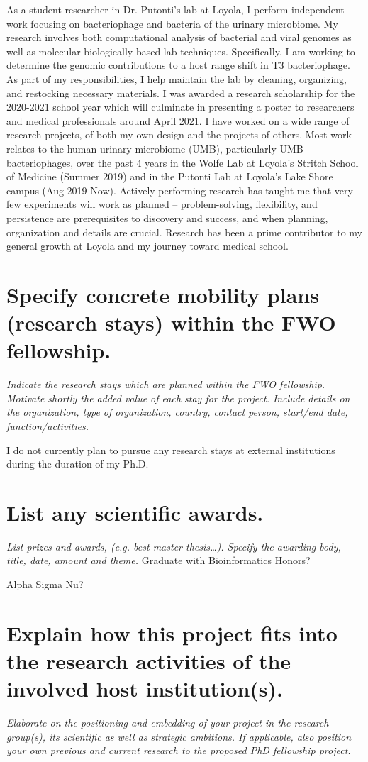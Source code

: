 As a student researcher in Dr. Putonti’s lab at Loyola, I perform independent work focusing on bacteriophage and bacteria of the urinary
microbiome. My research involves both computational analysis of bacterial and viral genomes as well as molecular biologically-based lab
techniques. Specifically, I am working to determine the genomic contributions to a host range shift in T3 bacteriophage. As part of my
responsibilities, I help maintain the lab by cleaning, organizing, and restocking necessary materials. I was awarded a research
scholarship for the 2020-2021 school year which will culminate in presenting a poster to researchers and medical professionals around
April 2021.
I have worked on a wide range of research projects, of both my own design and the projects of others. Most work relates to the human
urinary microbiome (UMB), particularly UMB bacteriophages, over the past 4 years in the Wolfe Lab at Loyola’s Stritch School of
Medicine (Summer 2019) and in the Putonti Lab at Loyola’s Lake Shore campus (Aug 2019-Now). Actively performing research has
taught me that very few experiments will work as planned -- problem-solving, flexibility, and persistence are prerequisites to discovery and
success, and when planning, organization and details are crucial. Research has been a prime contributor to my general growth at Loyola
and my journey toward medical school.


\section{Specify concrete mobility plans (research stays) within the FWO fellowship.}
\textit{
Indicate the research stays which are planned within the FWO fellowship. 
Motivate shortly the added value of each stay for the project. Include details on the organization, type of organization, country, contact person, start/end date, function/activities. 
}

I do not currently plan to pursue any research stays at external institutions during the duration of my Ph.D.


\section{List any scientific awards.}
\textit{
List prizes and awards, (e.g. best master thesis…). Specify the awarding body, title, date, amount and theme.
}
Graduate with Bioinformatics Honors?

Alpha Sigma Nu?


\section{Explain how this project fits into the research activities of the involved host institution(s).}
\textit{
Elaborate on the positioning and embedding of your project in the research group(s), its scientific as well as strategic ambitions. 
If applicable, also position your own previous and current research to the proposed PhD fellowship project.
}

